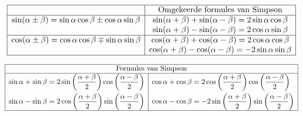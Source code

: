 \documentclass[a5paper]{article}
\begin{document}
\[
\begin{array}{|c|c|}
\hline
& \text{Omgekeerde formules van Simpson} \\ \hline

\sin(\alpha \pm \beta) = \sin\alpha\cos\beta \pm \cos\alpha\sin\beta &
\sin(\alpha + \beta) + \sin(\alpha - \beta) = 2\sin\alpha\cos\beta \\

& \sin(\alpha + \beta) - \sin(\alpha - \beta) = 2\cos\alpha\sin\beta \\ \hline

\cos(\alpha \pm \beta) = \cos\alpha\cos\beta \mp \sin\alpha\sin\beta &
\cos(\alpha + \beta) + \cos(\alpha - \beta) = 2\cos\alpha\cos\beta \\

& \cos(\alpha + \beta) - \cos(\alpha - \beta) = -2\sin\alpha\sin\beta \\ \hline

\end{array}
\]


\[
\begin{array}{|c|c|}
\hline
\multicolumn{2}{|c|}{\text{Formules van Simpson}} \\ \hline
\begin{aligned}
\sin \alpha + \sin \beta &= 2\sin\left(\frac{\alpha + \beta}{2}\right)\cos\left(\frac{\alpha - \beta}{2}\right) \\
\sin \alpha - \sin \beta &= 2\cos\left(\frac{\alpha + \beta}{2}\right)\sin\left(\frac{\alpha - \beta}{2}\right)
\end{aligned} & 
\begin{aligned}
\cos \alpha + \cos \beta &= 2\cos\left(\frac{\alpha + \beta}{2}\right)\cos\left(\frac{\alpha - \beta}{2}\right) \\
\cos \alpha - \cos \beta &= -2\sin\left(\frac{\alpha + \beta}{2}\right)\sin\left(\frac{\alpha - \beta}{2}\right)
\end{aligned} \\
\hline
\end{array}
\]
\newpage
\end{document}
